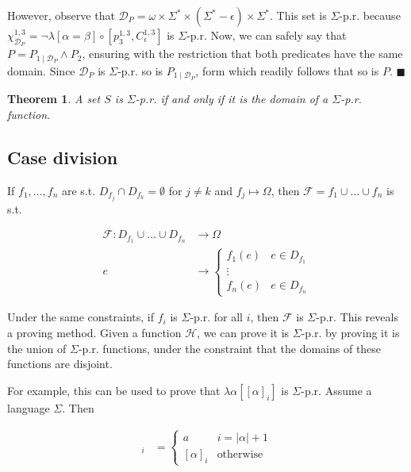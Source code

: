 \documentclass[a4paper, 12pt]{article}
\newtheorem{theorem}{Theorem}
\newtheorem{theorem}{Theorem}
\begin{document}
However, observe that $\mathcal{D}_P = \omega \times \Sigma^{*} \times
(\Sigma^{*} - \epsilon) \times \Sigma^{*} $. This set is $\Sigma$-p.r. because
$\chi_{\mathcal{D}_P}^{1, 3} = \neg \lambda \left[ \alpha = \beta \right] \circ
\left[ p_{3}^{1, 3}, C_{\epsilon}^{1, 3} \right]$ is $\Sigma$-p.r. Now, we can
safely say that $P = P_{1\mid \mathcal{D}_P} \land P_2$, ensuring with the
restriction that both predicates have the same domain. Since $\mathcal{D}_P$ is
$\Sigma$-p.r. so is $P_{1\mid \mathcal{D}_P}$, form which readily follows that
so is $P$. $\blacksquare$

\begin{theorem}
    A set $S$ is $\Sigma$-p.r. if and only if it is the domain of a
    $\Sigma$-p.r. function.
\end{theorem}

\subsection{Case division}

If $f_1, \ldots, f_n$ are s.t. $D_{f_j} \cap D_{f_k} = \emptyset$ for $j \neq k$
and $f_j \mapsto \Omega$, then $\mathcal{F} = f_1 \cup \ldots \cup f_n$ is s.t. 

\begin{align*}
    \mathcal{F} : D_{f_1} \cup \ldots \cup D_{f_n} &\to \Omega \\
    e &\to \begin{cases}
        f_1(e) & e \in D_{f_1} \\ 
               \vdots \\ 
        f_n(e) & e \in D_{f_n}
    \end{cases}
\end{align*}

Under the same constraints, if $f_i$ is $\Sigma$-p.r. for all $i$, then
$\mathcal{F}$ is $\Sigma$-p.r. This reveals a proving method. Given a function
$\mathcal{H}$, we can prove it is $\Sigma$-p.r. by proving it is the union of
$\Sigma$-p.r. functions, under the constraint that the domains of these
functions are disjoint.

For example, this can be used to prove that $\lambda \alpha\left[ \left[ \alpha
\right]_i  \right] $ is $\Sigma$-p.r. Assume a language $\Sigma$. Then

\begin{align*}
    [\alpha a]_i &= \begin{cases}
        a & i = |\alpha| + 1 \\ 
        [\alpha]_i & \text{otherwise}
    \end{cases}\\
\end{align*}
\end{document}
